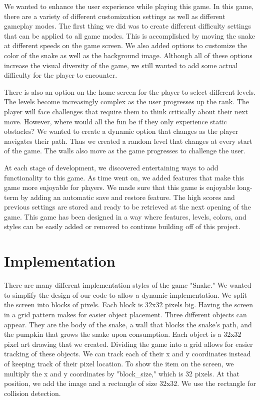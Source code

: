 \documentclass[sigplan,screen]{acmart}
\begin{document}
	We wanted to enhance the user experience while playing this game. In this game, there are a variety of different customization settings as well as different gameplay modes. The first thing we did was to create different difficulty settings that can be applied to all game modes. This is accomplished by moving the snake at different speeds on the game screen. We also added options to customize the color of the snake as well as the background image. Although all of these options increase the visual diversity of the game, we still wanted to add some actual difficulty for the player to encounter. 
	
	There is also an option on the home screen for the player to select different levels. The levels become increasingly complex as the user progresses up the rank. The player will face challenges that require them to think critically about their next move. However, where would all the fun be if they only experience static obstacles?  We wanted to create a dynamic option that changes as the player navigates their path. Thus we created a random level that changes at every start of the game. The walls also move as the game progresses to challenge the user. 
	
	At each stage of development, we discovered entertaining ways to add functionality to this game. As time went on, we added features that make this game more enjoyable for players. We made sure that this game is enjoyable long-term by adding an automatic save and restore feature. The high scores and previous settings are stored and ready to be retrieved at the next opening of the game. This game has been designed in a way where features, levels, colors, and styles can be easily added or removed to continue building off of this project.  

\section{Implementation}

There are many different implementation styles of the game "Snake." We wanted to simplify the design of our code to allow a dynamic implementation. We split the screen into blocks of pixels. Each block is 32x32 pixels big. Having the screen in a grid pattern makes for easier object placement. Three different objects can appear. They are the body of the snake, a wall that blocks the snake's path, and the pumpkin that grows the snake upon consumption. Each object is a 32x32 pixel art drawing that we created. Dividing the game into a grid allows for easier tracking of these objects. We can track each of their x and y coordinates instead of keeping track of their pixel location. To show the item on the screen, we multiply the x and y coordinates by "block\_size," which is 32 pixels. At that position, we add the image and a rectangle of size 32x32. We use the rectangle for collision detection. 
\end{document}
